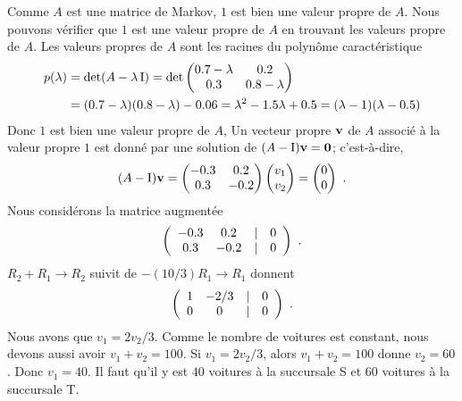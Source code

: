 {Comme $A$ est une matrice de Markov, $1$ est bien une valeur propre de
$A$.  Nous pouvons vérifier que $1$ est une valeur propre de $A$ en
trouvant les valeurs propre de $A$.  Les valeurs propres de $A$ sont
les racines du polynôme caractéristique
\begin{align*}
p(\lambda) &= \det(A-\lambda \operatorname{I}) =
\det\begin{pmatrix} 0.7-\lambda & 0.2 \\ 0.3 & 0.8-\lambda
\end{pmatrix} \\
&=(0.7-\lambda)(0.8-\lambda) - 0.06 = \lambda^2 -1.5\lambda+0.5
= (\lambda-1)(\lambda-0.5)
\end{align*}
Donc $1$ est bien une valeur propre de $A$,  Un vecteur propre
$\mathbf{v}$ de $A$ associé à la valeur propre $1$ est donné par une
solution de $(A-\operatorname{I})\mathbf{v}=\mathbf{0}$; c'est-à-dire,
\[
(A-\operatorname{I})\mathbf{v}
= \begin{pmatrix} -0.3 & 0.2 \\ 0.3 & -0.2 \end{pmatrix}
\begin{pmatrix} v_1 \\ v_2 \end{pmatrix}
= \begin{pmatrix} 0 \\ 0 \end{pmatrix} \ .
\]
Nous considérons la matrice augmentée
\[
\left(\begin{array}{cc@{\quad |\quad}c}
-0.3 & 0.2 & 0 \\ 0.3 & -0.2 & 0 \end{array}\right) \ .
\]
$R_2+R_1 \rightarrow R_2$ suivit de $-(10/3)R_1 \rightarrow R_1$
donnent
\[
\left(\begin{array}{cc@{\quad |\quad}c}
1 & -2/3 & 0 \\ 0 & 0 & 0 \end{array}\right) \ .
\]
Nous avons que $v_1 = 2v_2/3$.  Comme le nombre de voitures est constant, nous
devons aussi avoir $v_1 + v_2 = 100$.  Si $v_1 = 2v_2/3$, alors
$v_1 + v_2 = 100$ donne $v_2 = 60$.  Donc $v_1 = 40$.
Il faut qu'il y est $40$ voitures à la succursale S et $60$ voitures à
la succursale T.
}

